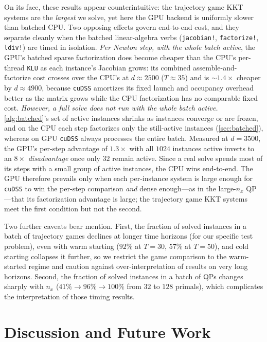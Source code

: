 \documentclass[conference]{IEEEtran}
\begin{document}
On its face, these results appear counterintuitive: the trajectory game KKT systems are the \emph{largest} we solve,
yet here the GPU backend is uniformly slower than batched CPU. Two opposing effects govern
end-to-end cost, and they separate cleanly when the batched linear-algebra verbs
(\texttt{jacobian!}, \texttt{factorize!}, \texttt{ldiv!}) are timed in isolation.
\emph{Per Newton step, with the whole batch active}, the GPU's batched sparse factorization
does become cheaper than the CPU's per-thread \texttt{KLU} as each instance's Jacobian grows:
its combined assemble-and-factorize cost crosses over the CPU's at $d \approx 2500$
($T \approx 35$) and is $\sim\!1.4\times$ cheaper by $d \approx 4900$, because \texttt{cuDSS}
amortizes its fixed launch and occupancy overhead better as the matrix grows while the CPU
factorization has no comparable fixed cost. \emph{However, a full solve does not run with the whole
batch active.} \cref{alg:batched}'s set of active instances shrinks as instances converge or are frozen,
and on the CPU each step factorizes only the still-active instances (\cref{sec:batched}),
whereas on GPU \texttt{cuDSS} always processes the entire batch. Measured at $d = 3500$, the GPU's
per-step advantage of $1.3\times$ with all $1024$ instances active inverts to an $8\times$
\emph{disadvantage} once only $32$ remain active. Since a real solve spends most of its steps
with a small group of active instances, the CPU wins end-to-end.
The GPU therefore prevails only when each per-instance system is large enough for
\texttt{cuDSS} to win the per-step comparison \emph{and} dense enough---as in the large-$n_x$
QP---that its factorization advantage is large; the trajectory game KKT
systems meet the first condition but not the second.

Two further caveats bear mention. First, the fraction of solved instances in a
batch of trajectory games declines at longer
time horizons (for our specific test problem), even with warm starting ($92\%$ at $T = 30$, $57\%$ at $T = 50$), and cold starting
collapses it further, so we restrict the game comparison to the warm-started
regime and caution against over-interpretation of results on very long horizons.
Second, the fraction of solved instances in a batch of QPs changes sharply with $n_x$ ($41\% \to 96\% \to 100\%$ from
$32$ to $128$ primals), which complicates the interpretation of those timing results.


\section{Discussion and Future Work}
\label{sec:discussion}
\end{document}

